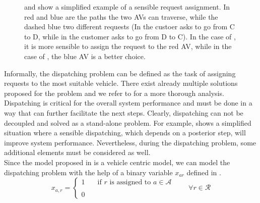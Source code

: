 \begin{figure}
\begin{subfigure}{0.5\linewidth}
		\caption{}
		\label{fig:req_notassignable}
	\end{subfigure}
	\caption[Example of a Sensible Request aAignment]{ and  show a simplified example of a sensible request assignment. In red and blue are the paths the two AVs can traverse, while the dashed blue two different requests (In  the custoer asks to go from C to D, while in  the customer asks to go from D to C). In the case of , it is more sensible to assign the request to the red AV, while in the case of , the blue AV is a better choice. }
	\label{fig:sens_assignment}
\end{figure}

Informally, the dispatching problem can be defined as the task of assigning requests to the most suitable vehicle. There exist already multiple solutions proposed for the problem and we refer to  for a more thorough analysis. \\
Dispatching is critical for the overall system performance and must be done in a way that can further facilitate the next steps. Clearly, dispatching can not be decoupled and solved as a stand-alone problem. For example,  shows a simplified situation where a sensible dispatching, which depends on a posterior step, will improve system performance. Nevertheless, during the dispatching problem, some additional elements must be considered as well. \\
Since the model proposed in  is a vehicle centric model, we can model the dispatching problem with the help of a binary variable $x_{ar}$ defined in . 
\begin{equation*}
	x_{a,r} = 
	\begin{cases} 
		1 & \quad \text{if $r$ is assigned to } a \in \mathcal{A}\\
		\\
		0
	\end{cases}
	\quad\quad \forall r \in \mathcal{R}
	\label{eq:dispatching_var}
\end{equation*}

